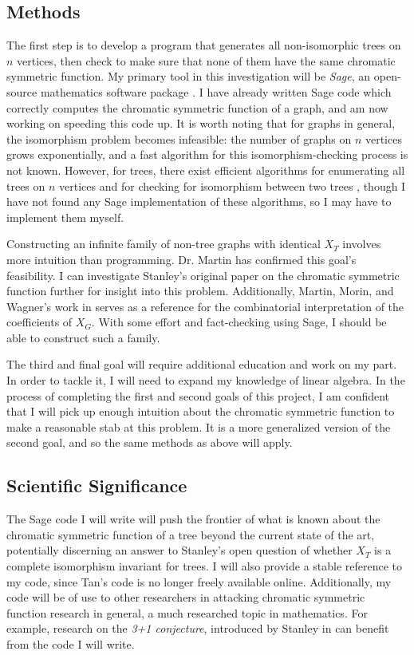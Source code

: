 \documentclass[a4paper,12pt]{article}
\begin{document}
\begin{spacing}{1}
\subsection*{Methods}
The first step is to develop a program that generates all non-isomorphic trees on $n$ vertices, then check to make sure that none of them have the same chromatic symmetric function. My primary tool in this investigation will be \emph{Sage}, an open-source mathematics software package \cite{sagemath}. I have already written Sage code which correctly computes the chromatic symmetric function of a graph, and am now working on speeding this code up. It is worth noting that for graphs in general, the isomorphism problem becomes infeasible: the number of graphs on $n$ vertices grows exponentially, and a fast algorithm for this isomorphism-checking process is not known. However, for trees, there exist efficient algorithms for enumerating all trees on $n$ vertices \cite{generatefreetrees} and for checking for isomorphism between two trees \cite{Buss97alogtimealgorithms}, though I have not found any Sage implementation of these algorithms, so I may have to implement them myself.

Constructing an infinite family of non-tree graphs with identical $X_T$ involves more intuition than programming. Dr. Martin has confirmed this goal's feasibility. I can investigate Stanley's original paper on the chromatic symmetric function further for insight into this problem. Additionally, Martin, Morin, and Wagner's work in \cite{distinguishtrees} serves as a reference for the combinatorial interpretation of the coefficients of $X_G$. With some effort and fact-checking using Sage, I should be able to construct such a family.

The third and final goal will require additional education and work on my part. In order to tackle it, I will need to expand my knowledge of linear algebra. In the process of completing the first and second goals of this project, I am confident that I will pick up enough intuition about the chromatic symmetric function to make a reasonable stab at this problem. It is a more generalized version of the second goal, and so the same methods as above will apply.

\subsection*{Scientific Significance}
The Sage code I will write will push the frontier of what is known about the chromatic symmetric function of a tree beyond the current state of the art, potentially discerning an answer to Stanley's open question of whether $X_T$ is a complete isomorphism invariant for trees. I will also provide a stable reference to my code, since Tan's code is no longer freely available online. Additionally, my code will be of use to other researchers in attacking chromatic symmetric function research in general, a much researched topic in mathematics. For example, research on the \emph{3+1 conjecture}, introduced by Stanley in \cite{csfstanley} can benefit from the code I will write.


\end{spacing}
\end{document}
